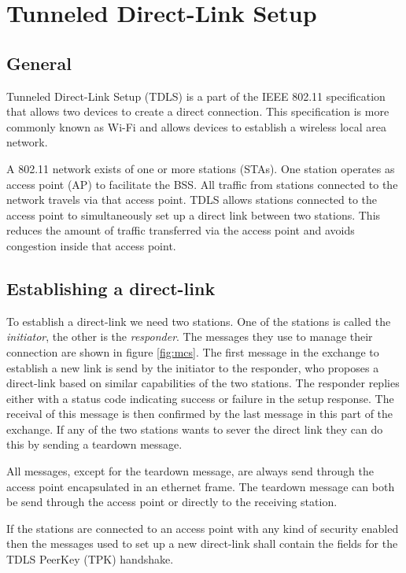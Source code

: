 \section{Tunneled Direct-Link Setup}\label{tdls}

\iffalse
- TDLS
	- 802.11
	- PeerKey
\fi

\subsection{General}

Tunneled Direct-Link Setup (TDLS) is a part of the IEEE 802.11 specification\cite{ieee80211} that allows two devices to create a direct connection. This specification is more commonly known as Wi-Fi and allows devices to establish a wireless local area network.

A 802.11 network exists of one or more stations (STAs). One station operates as access point (AP) to facilitate the BSS. All traffic from stations connected to the network travels via that access point. TDLS allows stations connected to the access point to simultaneously set up a direct link between two stations. This reduces the amount of traffic transferred via the access point and avoids congestion inside that access point.

\subsection{Establishing a direct-link}

To establish a direct-link we need two stations. One of the stations is called the \emph{initiator}, the other is the \emph{responder}. The messages they use to manage their connection are shown in figure \ref{fig:mcs}. The first message in the exchange to establish a new link is send by the initiator to the responder, who proposes a direct-link based on similar capabilities of the two stations. The responder replies either with a status code indicating success or failure in the setup response. The receival of this message is then confirmed by the last message in this part of the exchange. If any of the two stations wants to sever the direct link they can do this by sending a teardown message.

All messages, except for the teardown message, are always send through the access point encapsulated in an ethernet frame. The teardown message can both be send through the access point or directly to the receiving station.

If the stations are connected to an access point with any kind of security enabled then the messages used to set up a new direct-link shall contain the fields for the TDLS PeerKey (TPK) handshake.


